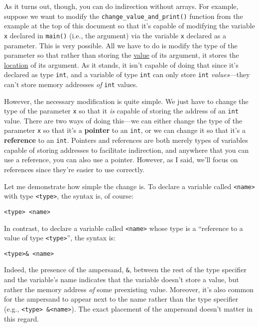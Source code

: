 \documentclass{article}
\begin{document}
As it turns out, though, you can do indirection without arrays. For example, suppose we want to modify the \texttt{change\_value\_and\_print()} function from the example at the top of this document so that it's capable of modifying the variable \texttt{x} declared in \texttt{main()} (i.e., the argument) via the variable \texttt{x} declared as a parameter. This is very possible. All we have to do is modify the type of the parameter so that rather than storing the \ul{value} of its argument, it stores the \ul{location} of its argument. As it stands, it isn't capable of doing that since it's declared as type \texttt{int}, and a variable of type \texttt{int} can only store \texttt{int} \textit{values}---they can't store memory addresses \textit{of} \texttt{int} values.

However, the necessary modification is quite simple. We just have to change the type of the parameter \texttt{x} so that it \textit{is} capable of storing the address of an \texttt{int} value. There are two ways of doing this---we can either change the type of the parameter \texttt{x} so that it's a \textbf{pointer} to an \texttt{int}, or we can change it so that it's a \textbf{reference} to an \texttt{int}. Pointers and references are both merely types of variables capable of storing addresses to facilitate indirection, and anywhere that you can use a reference, you can also use a pointer. However, as I said, we'll focus on references since they're easier to use correctly.

Let me demonstrate how simple the change is. To declare a variable called \texttt{<name>} with type \texttt{<type>}, the syntax is, of course:

\begin{verbatim}
<type> <name>
\end{verbatim}

In contrast, to declare a variable called \texttt{<name>} whose type is a ``reference to a value of type \texttt{<type>}'', the syntax is:

\begin{verbatim}
<type>& <name>
\end{verbatim}

Indeed, the presence of the ampersand, \texttt{\&}, between the rest of the type specifier and the variable's name indicates that the variable doesn't store a value, but rather the memory address \textit{of} some preexisting value. Moreover, it's also common for the ampersand to appear next to the name rather than the type specifier (e.g., \texttt{<type> \&<name>}). The exact placement of the ampersand doesn't matter in this regard.
\end{document}

